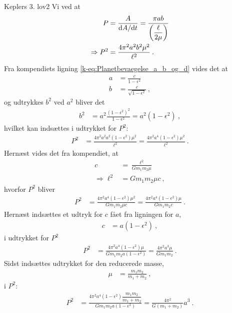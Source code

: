 \begin{opgave}{Keplers 3. lov}{2}
\opg Vi ved at
\begin{align*}
	P &= \frac{A}{\mathrm{d} A / \mathrm{d} t}
	= \frac{\pi a b}{\left(\dfrac{\ell}{2\mu}\right)} \\
	\Rightarrow	P^2 &= \frac{4 \pi^2 a^2 b^2 \mu^2}{\ell^2} \: .
\end{align*}
Fra kompendiets ligning \eqref{k-eq:Planetbevaegelse_a_b_og_d} vides det at
\begin{align*}
	a &= \frac{c}{1-\epsilon^2} \, \\
	b &= \frac{c}{\sqrt{1-\epsilon^2}} \: ,
\end{align*}
og udtrykkes $b^2$ ved $a^2$ bliver det
\begin{align*}
	b^2 &= a^2 \frac{(1-\epsilon^2)^2}{1-\epsilon^2}
	= a^2 (1-\epsilon^2) \: ,
\end{align*}
hvilket kan indsættes i udtrykket for $P^2$:
\begin{align*}
	P^2 &= \frac{4 \pi^2 a^2 a^2 (1-\epsilon^2) \mu^2}{\ell^2}
	= \frac{4 \pi^2 a^4 (1-\epsilon^2) \mu^2}{\ell^2} \: .
\end{align*}
Hernæst vides det fra kompendiet, at
\begin{align*}
	c &= \frac{\ell^2}{Gm_1m_2\mu} \\
	\Rightarrow \ell^2 &= Gm_1m_2\mu c \: ,
\end{align*}
hvorfor $P^2$ bliver
\begin{align*}
	P^2 &= \frac{4 \pi^2 a^4 (1-\epsilon^2) \mu^2}{Gm_1m_2\mu c}
	= \frac{4 \pi^2 a^4 (1-\epsilon^2) \mu}{Gm_1m_2 c} \: .
\end{align*}
Hernæst indsættes et udtryk for $c$ fået fra ligningen for $a$,
\begin{align*}
	c &= a(1-\epsilon^2) \: ,
\end{align*}
i udtrykket for $P^2$
\begin{align*}
	P^2 &= \frac{4 \pi^2 a^4 (1-\epsilon^2) \mu}{Gm_1m_2 a(1-\epsilon^2)}
	= \frac{4 \pi^2 a^3 \mu}{Gm_1m_2} \: .
\end{align*}
Sidst indsættes udtrykket for den reducerede masse,
\begin{align*}
	\mu &= \frac{m_1m_2}{m_1+m_2} \: ,
\end{align*}
i $P^2$:
\begin{align*}
	P^2 &= \frac{4 \pi^2 a^4 (1-\epsilon^2) \dfrac{m_1m_2}{m_1+m_2}}{Gm_1m_2 a(1-\epsilon^2)}
	= \frac{4 \pi^2}{G(m_1+m_2)}a^3 \: .
\end{align*}
\end{opgave}
